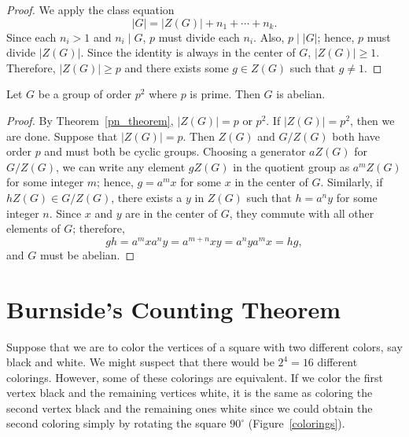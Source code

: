  
\begin{proof}
We apply the class equation
\[
|G| = |Z(G)|  + n_1 + \cdots + n_k.
\]
Since each $n_i>1$ and $n_i \mid G$, $p$  must divide each $n_i$.
Also, $p \mid |G|$; hence, $p$ must divide $|Z(G)|$. Since the
identity is always in the center of $G$, $|Z(G)| \geq 1$. Therefore,
$|Z(G)|  \geq p$ and there exists some $g \in Z(G)$ such that $g \neq
1$. 
\mbox{\hspace*{1in}} 
\end{proof}
 
 
\begin{corollary}\label{actions:p2abelian}
Let $G$ be a group of order $p^2$ where $p$ is prime. Then $G$ is
abelian. 
\end{corollary}
 
 
\begin{proof}
By Theorem~\ref{pn_theorem}, $|Z(G)| = p$ or $p^2$.  If $|Z(G)| = p^2$, then
we are done.  Suppose that $|Z(G)| = p$. Then $Z(G)$ and $G / Z(G)$
both have order $p$ and must both be cyclic groups.  Choosing  a
generator $aZ(G)$ for $G / Z(G)$, we can write any element $gZ(G)$ in
the quotient group as $a^m Z(G)$ for some integer $m$; hence, $g = a^m
x$ for some $x$ in the center of $G$.  Similarly, if $hZ(G) \in G /
Z(G)$, there exists a $y$ in $Z(G)$ such that $h = a^n y$ for some
integer $n$.  Since $x$ and $y$ are in the center of $G$, they commute
with all other elements of $G$; therefore, 
\[
gh  =  a^m x a^n y =  a^{m+n} x y = a^n y a^m x = hg,
\]
and $G$ must be abelian.
\end{proof}
 
 
 
\section{Burnside's Counting Theorem}
 
 
 
Suppose that we are to color the vertices of a square with two
different colors, say black and white.  We might suspect that there
would be $2^4=16$ different colorings. However, some of these
colorings are equivalent.  If we color the first vertex black and the
remaining vertices white, it is the same as coloring the second vertex
black and the remaining ones white since we could obtain the second
coloring simply by rotating the square $90^\circ$
(Figure~\ref{colorings}). 
 
